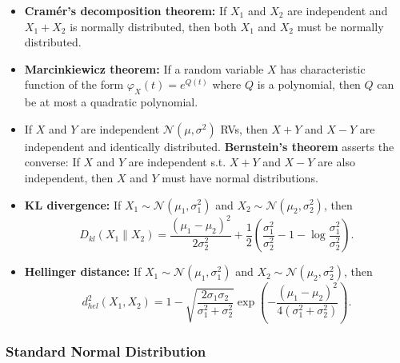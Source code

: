 \documentclass[twoside]{article}
\newcommand\calN{\mathcal{N}}
\newcommand\sg{\sigma}
\begin{document}
\begin{itemize}
\item \textbf{Cram\'{e}r's decomposition theorem:} If $X_1$ and $X_2$ are independent and $X_1 + X_2$ is normally distributed, then both $X_1$ and $X_2$ must be normally distributed.

\item \textbf{Marcinkiewicz theorem:} If a random variable $X$ has characteristic function of the form $\varphi_X(t) = e^{Q(t)}$ where $Q$ is a polynomial, then $Q$ can be at most a quadratic polynomial.

\item If $X$ and $Y$ are independent $\calN(\mu, \sg^2)$ RVs, then $X+Y$ and $X-Y$ are independent and identically distributed. \textbf{Bernstein's theorem} asserts the converse: If $X$ and $Y$ are independent s.t. $X+Y$ and $X-Y$ are also independent, then $X$ and $Y$ must have normal distributions.

\item \textbf{KL divergence:} If $X_1 \sim \calN(\mu_1, \sg_1^2)$ and $X_2 \sim \calN(\mu_2, \sg_2^2)$, then \[ D_{kl}(X_1 \parallel X_2) = \dfrac{(\mu_1 - \mu_2)^2}{2\sg_2^2} + \dfrac{1}{2}\left( \dfrac{\sg_1^2}{\sg_2^2} - 1 - \log \dfrac{\sg_1^2}{\sg_2^2}  \right). \]

\item \textbf{Hellinger distance:} If $X_1 \sim \calN(\mu_1, \sg_1^2)$ and $X_2 \sim \calN(\mu_2, \sg_2^2)$, then 
\[d_{hel}^2(X_1, X_2) = 1 - \sqrt{\dfrac{2\sg_1\sg_2}{\sg_1^2 + \sg_2^2}} \exp \left(-\dfrac{(\mu_1 - \mu_2)^2}{4(\sg_1^2 + \sg_2^2)} \right).\]

\end{itemize}

\subsubsection{Standard Normal Distribution}
\end{document}
